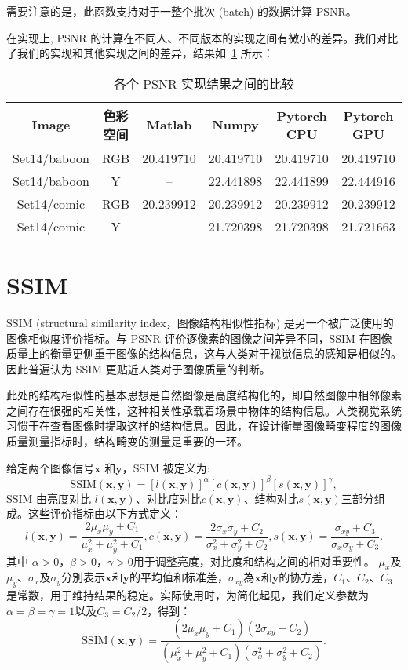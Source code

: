 \documentclass[../main.tex]{subfiles}
\begin{document}
需要注意的是，此函数支持对于一整个批次 (batch) 的数据计算 PSNR。

在实现上, PSNR 的计算在不同人、不同版本的实现之间有微小的差异。我们对比了我们的实现和其他实现之间的差异，结果如\tablename~\ref{tab:psnr} 所示：

\begin{table}[]
    \centering
    \begin{tabular}{c|c|c|c|c|c}
    \toprule
        Image & 色彩空间 & Matlab & Numpy & Pytorch CPU & Pytorch GPU \\
        \midrule
        Set14/baboon & RGB & 20.419710 & 20.419710 & 20.419710 & 20.419710 \\
        Set14/baboon & Y & -- & 22.441898 & 22.441899 & 22.444916\\
        Set14/comic & RGB & 20.239912& 20.239912&20.239912	&20.239912\\
Set14/comic&Y&--&21.720398&21.720398&21.721663\\
\bottomrule
    \end{tabular}
    \caption{各个 PSNR 实现结果之间的比较}
    \label{tab:psnr}
\end{table}

\section{SSIM}
SSIM (structural similarity index，图像结构相似性指标) 是另一个被广泛使用的图像相似度评价指标。与 PSNR 评价逐像素的图像之间差异不同，SSIM 在图像质量上的衡量更侧重于图像的结构信息，这与人类对于视觉信息的感知是相似的。因此普遍认为 SSIM 更贴近人类对于图像质量的判断。

此处的结构相似性的基本思想是自然图像是高度结构化的，即自然图像中相邻像素之间存在很强的相关性，这种相关性承载着场景中物体的结构信息。人类视觉系统习惯于在查看图像时提取这样的结构信息。因此，在设计衡量图像畸变程度的图像质量测量指标时，结构畸变的测量是重要的一环。

给定两个图像信号$\mathbf{x}$ 和$\mathbf{y} $，SSIM 被定义为:
$$\text{SSIM}(\mathbf {x} ,\mathbf {y} )=[l(\mathbf {x} ,\mathbf {y} )]^{\alpha }[c(\mathbf {x} ,\mathbf {y} )]^{\beta }[s(\mathbf {x} ,\mathbf {y} )]^{\gamma },$$
SSIM 由亮度对比 $l(\mathbf {x} ,\mathbf {y} )$、对比度对比$c(\mathbf {x} ,\mathbf {y} )$、结构对比$s(\mathbf {x} ,\mathbf {y} )$三部分组成。这些评价指标由以下方式定义：
$$
l(\mathbf {x} ,\mathbf {y} )={\frac {2\mu _{x}\mu _{y}+C_{1}}{\mu _{x}^{2}+\mu _{y}^{2}+C_{1}}},
c(\mathbf {x} ,\mathbf {y} )={\frac {2\sigma _{x}\sigma _{y}+C_{2}}{\sigma _{x}^{2}+\sigma _{y}^{2}+C_{2}}},
s(\mathbf {x} ,\mathbf {y} )={\frac {\sigma _{xy}+C_{3}}{\sigma _{x}\sigma _{y}+C_{3}}}.
$$
其中 $\alpha >0$，$\beta >0$，$\gamma >0$用于调整亮度，对比度和结构之间的相对重要性。
$\mu _{x}$及$\mu _{y}$、$\sigma _{x}$及$\sigma_{y}$分別表示$\mathbf{x}$和$\mathbf {y}$的平均值和标准差，$\sigma_{xy}$為$\mathbf{x}$和$\mathbf{y}$的协方差，$C_{1}$、$C_{2}$、$C_{3}$是常数，用于维持结果的稳定。实际使用时，为简化起见，我们定义参数为$\alpha =\beta =\gamma =1$以及$C_{3}=C_{2}/2$，得到：
$$
{\text{SSIM}}(\mathbf {x} ,\mathbf {y} )={\frac {(2\mu _{x}\mu _{y}+C_{1})(2\sigma _{xy}+C_{2})}{(\mu _{x}^{2}+\mu _{y}^{2}+C_{1})(\sigma _{x}^{2}+\sigma _{y}^{2}+C_{2})}}.
$$
\end{document}
